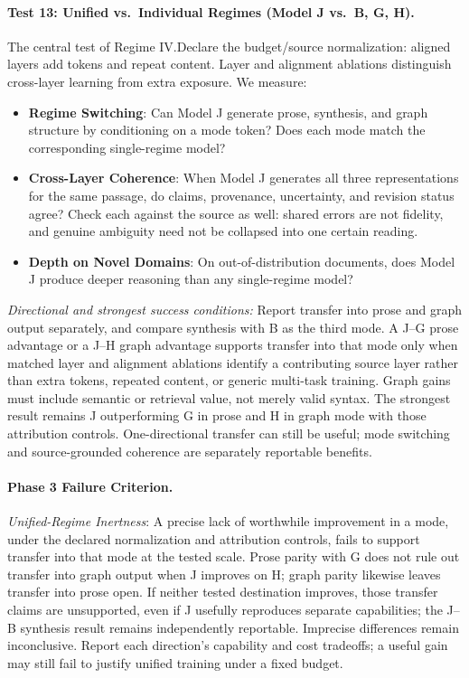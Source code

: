 \documentclass[11pt]{article}
\begin{document}
\paragraph{Test 13: Unified vs.\ Individual Regimes (Model J vs.\ B, G, H).}
The central test of Regime IV.\@ Declare the budget/source normalization: aligned layers add tokens and
repeat content. Layer and alignment ablations distinguish cross-layer learning
from extra exposure. We measure:
\begin{itemize}
    \item \textbf{Regime Switching}: Can Model J generate prose, synthesis,
    and graph structure by conditioning on a mode token? Does each mode
    match the corresponding single-regime model?
    \item \textbf{Cross-Layer Coherence}: When Model J generates all three
    representations for the same passage, do claims, provenance, uncertainty,
    and revision status agree? Check each against the source as well: shared
    errors are not fidelity, and genuine ambiguity need not be collapsed into
    one certain reading.
    \item \textbf{Depth on Novel Domains}: On out-of-distribution documents,
    does Model J produce deeper reasoning than any single-regime model?
\end{itemize}
\emph{Directional and strongest success conditions:} Report transfer into
prose and graph output separately, and compare synthesis with B as the third
mode. A J--G prose advantage or a J--H graph advantage supports transfer into
that mode only when matched layer and alignment ablations identify a
contributing source layer rather than extra tokens, repeated content, or
generic multi-task training. Graph gains
must include semantic or retrieval value, not merely valid syntax. The
strongest result remains J outperforming G in prose and H in graph mode with
those attribution controls. One-directional transfer can still be useful;
mode switching and source-grounded coherence are separately reportable benefits.

\paragraph{Phase 3 Failure Criterion.}
\emph{Unified-Regime Inertness}: A precise lack of worthwhile improvement in a
mode, under the declared normalization and attribution controls, fails to
support transfer into that mode at the tested scale. Prose parity with G does
not rule out transfer into graph output when J improves on H; graph parity
likewise leaves transfer into prose open. If neither tested destination
improves, those transfer claims are unsupported, even if J usefully reproduces
separate capabilities; the J--B synthesis result remains independently
reportable. Imprecise differences remain inconclusive. Report each
direction's capability and cost tradeoffs; a useful gain may still fail to
justify unified training under a fixed budget.
\end{document}
